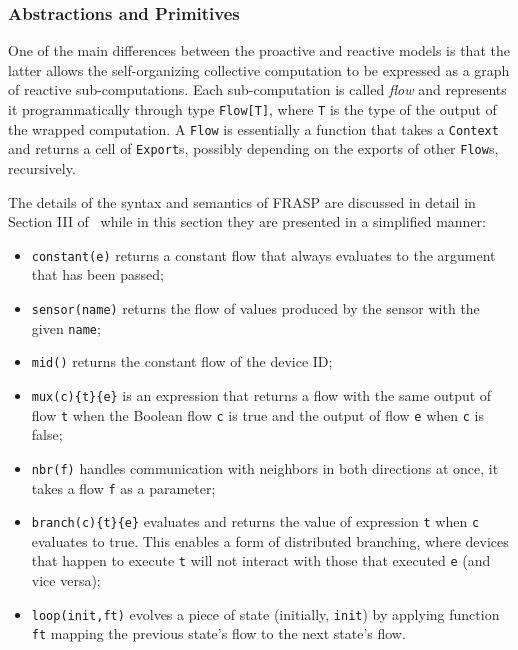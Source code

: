 \subsubsection{Abstractions and Primitives}
\label{subsubsection:abstractions-and-primitives}

One of the main differences between the proactive and reactive models is that the latter allows the self-organizing collective computation to be expressed as a graph of reactive sub-computations. Each sub-computation is called \textit{flow} and represents it programmatically through type \texttt{Flow[T]}, where \texttt{T} is the type of the output of the wrapped computation. A \texttt{Flow} is essentially a function that takes a \texttt{Context} and returns a cell of \texttt{Export}s, possibly depending on the exports of other \texttt{Flow}s, recursively.

The details of the syntax and semantics of FRASP are discussed in detail in Section III of~\cite{Casadei2023} while in this section they are presented in a simplified manner:

\begin{itemize}
    \item \texttt{constant(e)} returns a constant flow that always evaluates to the argument that has been passed;
    \item \texttt{sensor(name)} returns the flow of values produced by the sensor with the given \texttt{name};
    \item \texttt{mid()} returns the constant flow of the device ID;
    \item \texttt{mux(c)\{t\}\{e\}} is an expression that returns a flow with the same output of flow \texttt{t} when the Boolean flow \texttt{c} is true and the output of flow \texttt{e} when \texttt{c} is false;
    \item \texttt{nbr(f)} handles communication with neighbors in both directions at once, it takes a flow \texttt{f} as a parameter;
    \item \texttt{branch(c)\{t\}\{e\}} evaluates and returns the value of expression \texttt{t} when \texttt{c} evaluates to true. This enables a form of distributed branching, where devices that happen to execute \texttt{t} will not interact with those that executed \texttt{e} (and vice versa);
    \item \texttt{loop(init,ft)} evolves a piece of state (initially, \texttt{init}) by applying function \texttt{ft} mapping the previous state's flow to the next state's flow.
\end{itemize}

